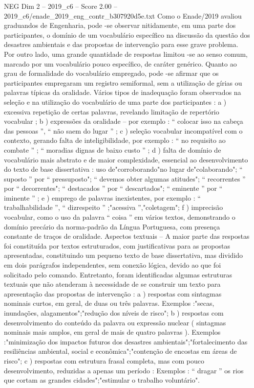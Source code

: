 \begin{textsample}{NEG Dim 2 – 2019\_c6 – Score 2.00 – 2019\_c6/enade\_2019\_eng\_contr\_b307920d5e.txt}
Como o Enade/2019 avaliou graduandos de Engenharia, pode -se observar nitidamente, em uma parte dos participantes, o domínio de um vocabulário específico na discussão da questão dos desastres ambientais e das propostas de intervenção para esse grave problema.
Por outro lado, uma grande quantidade de respostas limitou -se ao senso comum, marcado por um vocabulário pouco específico, de caráter genérico.
Quanto ao grau de formalidade do vocabulário empregado, pode -se afirmar que os participantes empregaram um registro semiformal, sem a utilização de gírias ou palavras típicas da oralidade.
Vários tipos de inadequação foram observados na seleção e na utilização do vocabulário de uma parte dos participantes : a ) excessiva repetição de certas palavras, revelando limitação de repertório vocabular ; b ) expressões da oralidade – por exemplo : “ colocar isso na cabeça das pessoas ”, “ não saem do lugar ” ; c ) seleção vocabular incompatível com o contexto, gerando falta de inteligibilidade, por exemplo : “ no requisito ao combate ” ; “ moradias dignas de baixo custo ” ; d ) falta de domínio de vocabulário mais abstrato e de maior complexidade, essencial ao desenvolvimento do texto de base dissertativa : uso de"corroborando"no lugar de"colaborando"; “ suposto ” por “ pressuposto"; “ devemos obter algumas atitudes"; “ recorrentes ” por “ decorrentes"; “ destacados ” por “ descartados"; “ eminente ” por “ iminente ” ; e ) emprego de palavras inexistentes, por exemplo : “ trabalhabilidade ”, “ dizrespeito ” ;"acessiva ”,"coletagem"; f ) imprecisão vocabular, como o uso da palavra “ coisa ” em vários textos, demonstrando o domínio precário da norma-padrão da Língua Portuguesa, com presença constante de traços de oralidade.
Aspectos textuais – A maior parte das respostas foi constituída por textos estruturados, com justificativas para as propostas apresentadas, constituindo um pequeno texto de base dissertativa, mas dividido em dois parágrafos independentes, sem conexão lógica, devido ao que foi solicitado pelo comando.
Entretanto, foram identificadas algumas estruturas textuais que não atenderam à necessidade de se construir um texto para apresentação das propostas de intervenção : a ) respostas com sintagmas nominais curtos, em geral, de duas ou três palavras.
Exemplos :"secas, inundações, alagamentos";"redução dos níveis de risco"; b ) respostas com desenvolvimento do conteúdo da palavra ou expressão nuclear ( sintagmas nominais mais amplos, em geral de mais de quatro palavras ).
Exemplos :"minimização dos impactos futuros dos desastres ambientais";"fortalecimento das resiliências ambiental, social e econômica";"contenção de encostas em áreas de risco"; c ) respostas com estrutura frasal completa, mas com pouco desenvolvimento, reduzidas a apenas um período : Exemplos : “ dragar ” os rios que cortam as grandes cidades";"estimular o trabalho voluntário".

\end{textsample}
